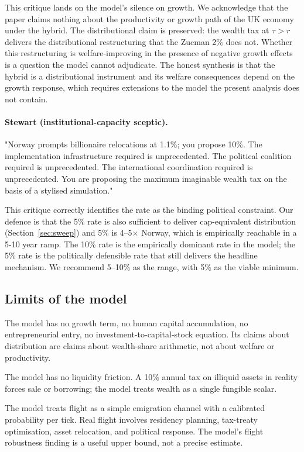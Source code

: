 \documentclass[11pt]{article}
\begin{document}
This critique lands on the model's silence on growth.  We
acknowledge that the paper claims nothing about the productivity
or growth path of the UK economy under the hybrid.  The
distributional claim is preserved: the wealth tax at $\tau > r$
delivers the distributional restructuring that the Zucman 2\%
does not.  Whether this restructuring is welfare-improving in the
presence of negative growth effects is a question the model cannot
adjudicate.  The honest synthesis is that the hybrid is a
distributional instrument and its welfare consequences depend on
the growth response, which requires extensions to the model the
present analysis does not contain.

\paragraph{Stewart (institutional-capacity sceptic).}  "Norway
prompts billionaire relocations at 1.1\%; you propose 10\%.  The
implementation infrastructure required is unprecedented.  The
political coalition required is unprecedented.  The international
coordination required is unprecedented.  You are proposing the
maximum imaginable wealth tax on the basis of a stylised
simulation."

This critique correctly identifies the rate as the binding
political constraint.  Our defence is that the 5\% rate is also
sufficient to deliver cap-equivalent distribution
(Section~\ref{sec:sweep}) and 5\% is 4--5$\times$ Norway, which
is empirically reachable in a 5-10 year ramp.  The 10\% rate is
the empirically dominant rate in the model; the 5\% rate is the
politically defensible rate that still delivers the headline
mechanism.  We recommend 5--10\% as the range, with 5\% as the
viable minimum.

\subsection{Limits of the model}

The model has no growth term, no human capital accumulation, no
entrepreneurial entry, no investment-to-capital-stock equation.
Its claims about distribution are claims about wealth-share
arithmetic, not about welfare or productivity.

The model has no liquidity friction.  A 10\% annual tax on
illiquid assets in reality forces sale or borrowing; the model
treats wealth as a single fungible scalar.

The model treats flight as a simple emigration channel with a
calibrated probability per tick.  Real flight involves residency
planning, tax-treaty optimisation, asset relocation, and
political response.  The model's flight robustness finding is a
useful upper bound, not a precise estimate.
\end{document}
